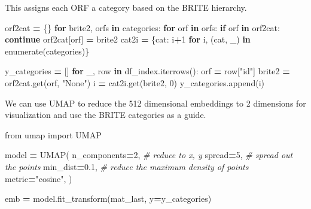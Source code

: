 \documentclass[
]{book}
\newenvironment{Shaded}{\begin{snugshade}}{\end{snugshade}}
\newcommand{\BuiltInTok}[1]{#1}
\newcommand{\CommentTok}[1]{\textcolor[rgb]{0.56,0.35,0.01}{\textit{#1}}}
\newcommand{\ControlFlowTok}[1]{\textcolor[rgb]{0.13,0.29,0.53}{\textbf{#1}}}
\newcommand{\DecValTok}[1]{\textcolor[rgb]{0.00,0.00,0.81}{#1}}
\newcommand{\FloatTok}[1]{\textcolor[rgb]{0.00,0.00,0.81}{#1}}
\newcommand{\ImportTok}[1]{#1}
\newcommand{\KeywordTok}[1]{\textcolor[rgb]{0.13,0.29,0.53}{\textbf{#1}}}
\newcommand{\NormalTok}[1]{#1}
\newcommand{\OperatorTok}[1]{\textcolor[rgb]{0.81,0.36,0.00}{\textbf{#1}}}
\newcommand{\StringTok}[1]{\textcolor[rgb]{0.31,0.60,0.02}{#1}}
\begin{document}
This assigns each ORF a category based on the BRITE hierarchy.

\begin{Shaded}
\begin{Highlighting}[numbers=left,,]
\NormalTok{orf2cat }\OperatorTok{=}\NormalTok{ \{\}}
\ControlFlowTok{for}\NormalTok{ brite2, orfs }\KeywordTok{in}\NormalTok{ categories:}
    \ControlFlowTok{for}\NormalTok{ orf }\KeywordTok{in}\NormalTok{ orfs:}
        \ControlFlowTok{if}\NormalTok{ orf }\KeywordTok{in}\NormalTok{ orf2cat: }\ControlFlowTok{continue}
\NormalTok{        orf2cat[orf] }\OperatorTok{=}\NormalTok{ brite2}
\NormalTok{cat2i }\OperatorTok{=}\NormalTok{ \{cat: i}\OperatorTok{+}\DecValTok{1} \ControlFlowTok{for}\NormalTok{ i, (cat, \_) }\KeywordTok{in} \BuiltInTok{enumerate}\NormalTok{(categories)\}}

\NormalTok{y\_categories }\OperatorTok{=}\NormalTok{ []}
\ControlFlowTok{for}\NormalTok{ \_, row }\KeywordTok{in}\NormalTok{ df\_index.iterrows():}
\NormalTok{    orf }\OperatorTok{=}\NormalTok{ row[}\StringTok{"id"}\NormalTok{]}
\NormalTok{    brite2 }\OperatorTok{=}\NormalTok{ orf2cat.get(orf, }\StringTok{"None"}\NormalTok{)}
\NormalTok{    i }\OperatorTok{=}\NormalTok{ cat2i.get(brite2, }\DecValTok{0}\NormalTok{)}
\NormalTok{    y\_categories.append(i)}
\end{Highlighting}
\end{Shaded}

We can use UMAP to reduce the 512 dimensional embeddings to 2 dimensions for visualization
and use the BRITE categories as a guide.

\begin{Shaded}
\begin{Highlighting}[numbers=left,,]
\ImportTok{from}\NormalTok{ umap }\ImportTok{import}\NormalTok{ UMAP}

\NormalTok{model }\OperatorTok{=}\NormalTok{ UMAP(}
\NormalTok{    n\_components}\OperatorTok{=}\DecValTok{2}\NormalTok{, }\CommentTok{\# reduce to x, y}
\NormalTok{    spread}\OperatorTok{=}\DecValTok{5}\NormalTok{,       }\CommentTok{\# spread out the points}
\NormalTok{    min\_dist}\OperatorTok{=}\FloatTok{0.1}\NormalTok{,   }\CommentTok{\# reduce the maximum density of points}
\NormalTok{    metric}\OperatorTok{=}\StringTok{"cosine"}\NormalTok{,}
\NormalTok{)}

\NormalTok{emb }\OperatorTok{=}\NormalTok{ model.fit\_transform(mat\_last, y}\OperatorTok{=}\NormalTok{y\_categories)}
\end{Highlighting}
\end{Shaded}
\end{document}
